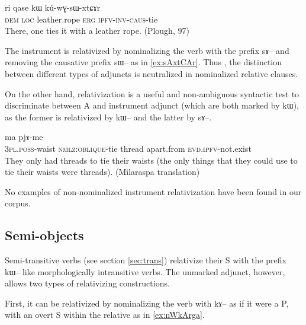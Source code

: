 \documentclass[oldfontcommands,oneside,a4paper,11pt]{article}
\newcommand{\ipa}[1]{{\phon #1}} %
\begin{document}
 \begin{exe}
  \ex   \label{ex:kuwGsWxtCAr}  
\gll \ipa{ɯnɯnɯ}  	\ipa{ri}  	\ipa{qase}  	\ipa{kɯ}  	\ipa{kú-wɣ-sɯ-xtɕɤr}  \\
\textsc{dem} \textsc{loc} leather.rope \textsc{erg} \textsc{ipfv-inv-caus}-tie \\
\glt There, one ties it with a leather rope. (Plough, 97)
   \end{exe} 
   

The instrument is relativized by nominalizing the verb with the prefix \ipa{sɤ}-- and removing the   causative prefix \ipa{sɯ}-- as in \ref{ex:sAxtCAr}. Thus , the distinction between different types of adjuncts is neutralized in nominalized relative clauses. 

On the other hand, relativization is a useful and non-ambiguous syntactic test to discriminate between A and instrument adjunct (which are both marked by \ipa{kɯ}), as the former is relativized by \ipa{kɯ--} and the latter by \ipa{sɤ--}.

 \begin{exe}
  \ex  \label{ex:sAxtCAr}  
  \gll [\ipa{nɯ-mtʰɤɣ}  	\ipa{sɤ-xtɕɤr}]  	\ipa{xɕɤfsa}  	\ipa{ma}  	\ipa{pjɤ-me}  \\
\textsc{3pl.poss}-waist \textsc{nmlz:oblique}-tie thread apart.from \textsc{evd.ipfv}-not.exist \\
\glt They only had threads to tie their waists (the only things that they could use to tie their waists were threads). (Milaraspa translation)
   \end{exe} 
   

   
No examples of non-nominalized instrument relativization have been found in our corpus.

\subsection{Semi-objects} \label{sec:other}

Semi-transitive verbs (see section \ref{sec:trans}) relativize their S with the prefix \ipa{kɯ}-- like   morphologically intransitive verbs.  The unmarked adjunct, however, allows two types of relativizing constructions.

First, it can be relativized by nominalizing the verb with \ipa{kɤ}-- as if it were a P, with an overt S within the relative as in \ref{ex:nWkArga}.
\end{document}
